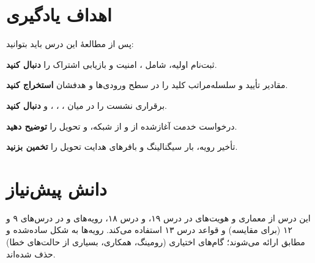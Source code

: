 \documentclass[11pt,a4paper]{article}
\begin{document}
\ACNcover

\section{اهداف یادگیری}
پس از مطالعهٔ این درس باید بتوانید:
\begin{objectives}
  \item ثبت‌نام اولیه، شامل ، امنیت  و بازیابی اشتراک را \textbf{دنبال کنید}.
  \item مقادیر تأیید و سلسله‌مراتب کلید  را در سطح ورودی‌ها و هدفشان \textbf{استخراج کنید}.
  \item برقراری نشست  را در میان ، ، ،  و  \textbf{دنبال کنید}.
  \item درخواست خدمت آغازشده از  و از شبکه،  و تحویل  را \textbf{توضیح دهید}.
  \item تأخیر رویه، بار سیگنالینگ  و بافرهای هدایت تحویل را \textbf{تخمین بزنید}.
\end{objectives}

\section{دانش پیش‌نیاز}
این درس از معماری و هویت‌های  در درس ۱۹،  و  درس ۱۸، رویه‌های  و  در درس‌های ۹ و
۱۲ (برای مقایسه) و قواعد  درس ۱۳ استفاده می‌کند. رویه‌ها به شکل ساده‌شده و مطابق  \cite{ts23502}
ارائه می‌شوند؛ گام‌های اختیاری (رومینگ، همکاری، بسیاری از حالت‌های خطا) حذف شده‌اند.
\end{document}
